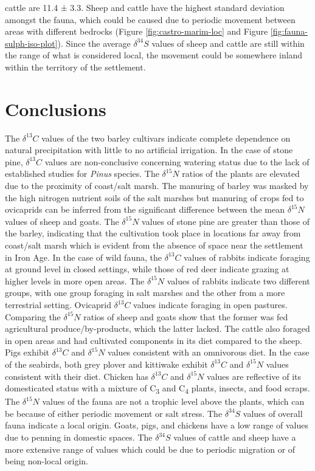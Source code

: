 \documentclass[3p]{elsarticle} %
\begin{document}
cattle are 11.4 ± 3.3\text{\textperthousand}. Sheep and cattle have the highest standard deviation amongst the fauna, which could be caused due to periodic movement between areas with different bedrocks (Figure \ref{fig:castro-marim-loc} and Figure \ref{fig:fauna-sulph-iso-plot}). Since the average \(\delta ^{34}S\) values of sheep and cattle are still within the range of what is considered local, the movement could be somewhere inland within the territory of the settlement.

\hypertarget{conclusions}{%
\section{Conclusions}\label{conclusions}}

The \(\delta ^{13}C\) values of the two barley cultivars indicate complete dependence on natural precipitation with little to no artificial irrigation. In the case of stone pine, \(\delta ^{13}C\) values are non-conclusive concerning watering status due to the lack of established studies for \emph{Pinus} species. The \(\delta ^{15}N\) ratios of the plants are elevated due to the proximity of coast/salt marsh. The manuring of barley was masked by the high nitrogen nutrient soils of the salt marshes but manuring of crops fed to ovicaprids can be inferred from the significant difference between the mean \(\delta ^{15}N\) values of sheep and goats. The \(\delta ^{15}N\) values of stone pine are greater than those of the barley, indicating that the cultivation took place in locations far away from coast/salt marsh which is evident from the absence of space near the settlement in Iron Age. In the case of wild fauna, the \(\delta ^{13}C\) values of rabbits indicate foraging at ground level in closed settings, while those of red deer indicate grazing at higher levels in more open areas. The \(\delta ^{15}N\) values of rabbits indicate two different groups, with one group foraging in salt marshes and the other from a more terrestrial setting. Ovicaprid \(\delta ^{13}C\) values indicate foraging in open pastures. Comparing the \(\delta ^{15}N\) ratios of sheep and goats show that the former was fed agricultural produce/by-products, which the latter lacked. The cattle also foraged in open areas and had cultivated components in its diet compared to the sheep. Pigs exhibit \(\delta ^{13}C\) and \(\delta ^{15}N\) values consistent with an omnivorous diet. In the case of the seabirds, both grey plover and kittiwake exhibit \(\delta ^{13}C\) and \(\delta ^{15}N\) values consistent with their diet. Chicken has \(\delta ^{13}C\) and \(\delta ^{15}N\) values are reflective of its domesticated status with a mixture of C\textsubscript{3} and C\textsubscript{4} plants, insects, and food scraps. The \(\delta ^{15}N\) values of the fauna are not a trophic level above the plants, which can be because of either periodic movement or salt stress. The \(\delta ^{34}S\) values of overall fauna indicate a local origin. Goats, pigs, and chickens have a low range of values due to penning in domestic spaces. The \(\delta ^{34}S\) values of cattle and sheep have a more extensive range of values which could be due to periodic migration or of being non-local origin.
\end{document}
